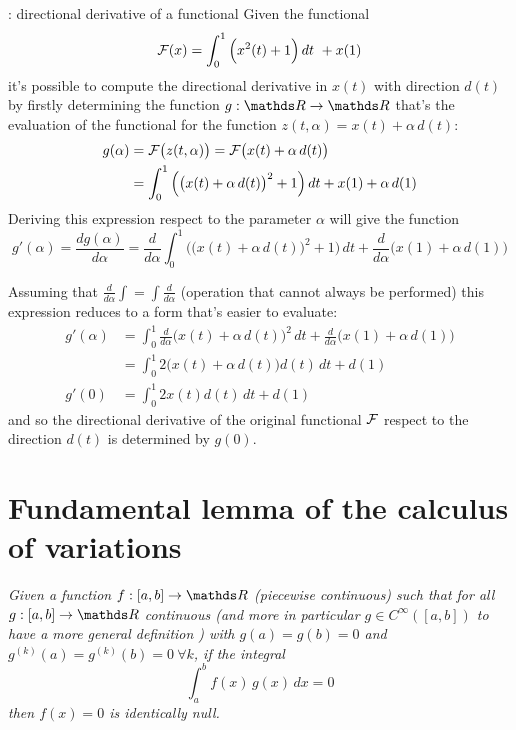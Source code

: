 	
	\begin{example}{: directional derivative of a functional}
		Given the functional
		\[ \mathcal{F}(x) = \int_0^1 \Big(x^2(t) + 1\Big) \, dt  \ + x(1) \]
		it's  possible to compute the directional derivative in $x(t)$ with direction $d(t)$ by firstly determining the function $g:\R\rightarrow \R$ that's the evaluation of the functional for the function $z(t,\alpha) = x(t) + \alpha \, d(t)$:
		\begin{align*}
			g(\alpha) & = \mathcal F \big(z(t,\alpha)\big) = \mathcal F\big(x(t) + \alpha\, d(t)\big) \\
			& = \int_0^1 \Big( \big(x(t) + \alpha\, d(t)\big)^2 + 1 \Big)\, dt  + x(1) + \alpha\, d(1)
		\end{align*}
		Deriving this expression respect to the parameter $\alpha$ will give the function
		\[ g'(\alpha ) = \frac{dg(\alpha)}{d\alpha} = \frac d{d\alpha } \int_0^1 \Big( \big(x(t) + \alpha\, d(t)\big)^2 + 1 \Big)\, dt  +  \frac d{d\alpha} \Big(x(1) + \alpha\, d(1)\Big) \]
		
		Assuming that $\frac d{d\alpha}\int = \int \frac d{d\alpha}$ (operation that cannot always be performed) this expression reduces to a form that's easier to evaluate:
		\begin{align*}
			g'(\alpha) &= \int_0^1 \frac d{d\alpha} \Big(x(t) + \alpha\, d(t)\Big)^2\, dt + \frac d{d\alpha} \Big(x(1) + \alpha \, d(1)\Big) \\
			& = \int_0^1 2\big(x(t) + \alpha\, d(t)\big) d(t)\, dt + d(1) \\
			g'(0)& = \int_0^1 2x(t)d(t)\, dt + d(1)
		\end{align*}
		and so the directional derivative of the original functional $\mathcal F$ respect to the direction $d(t)$ is determined by $g(0)$.
	\end{example}
	
\section{Fundamental lemma of the calculus of variations}
	{\itshape Given a function $f:[a,b]\rightarrow \R$ (piecewise continuous) such that for all $g:[a,b] \rightarrow \R$ continuous (and more in particular $g \in C^\infty([a,b])$ to have a more general definition ) with $g(a) = g(b) = 0$ and $g^{(k)}(a) = g^{(k)}(b) = 0 \ \forall k$, if the integral 
	\begin{equation} \label{eq:func:lemma}
		\int_a^b f(x)\,g(x) \, dx = 0
	\end{equation}
	then $f(x)= 0 $ is identically null. }

